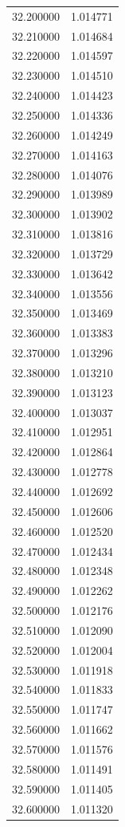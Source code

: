 \begin{tabular}{rr}
32.200000 & 1.014771 \\
32.210000 & 1.014684 \\
32.220000 & 1.014597 \\
32.230000 & 1.014510 \\
32.240000 & 1.014423 \\
32.250000 & 1.014336 \\
32.260000 & 1.014249 \\
32.270000 & 1.014163 \\
32.280000 & 1.014076 \\
32.290000 & 1.013989 \\
32.300000 & 1.013902 \\
32.310000 & 1.013816 \\
32.320000 & 1.013729 \\
32.330000 & 1.013642 \\
32.340000 & 1.013556 \\
32.350000 & 1.013469 \\
32.360000 & 1.013383 \\
32.370000 & 1.013296 \\
32.380000 & 1.013210 \\
32.390000 & 1.013123 \\
32.400000 & 1.013037 \\
32.410000 & 1.012951 \\
32.420000 & 1.012864 \\
32.430000 & 1.012778 \\
32.440000 & 1.012692 \\
32.450000 & 1.012606 \\
32.460000 & 1.012520 \\
32.470000 & 1.012434 \\
32.480000 & 1.012348 \\
32.490000 & 1.012262 \\
32.500000 & 1.012176 \\
32.510000 & 1.012090 \\
32.520000 & 1.012004 \\
32.530000 & 1.011918 \\
32.540000 & 1.011833 \\
32.550000 & 1.011747 \\
32.560000 & 1.011662 \\
32.570000 & 1.011576 \\
32.580000 & 1.011491 \\
32.590000 & 1.011405 \\
32.600000 & 1.011320 \\

\end{tabular}
